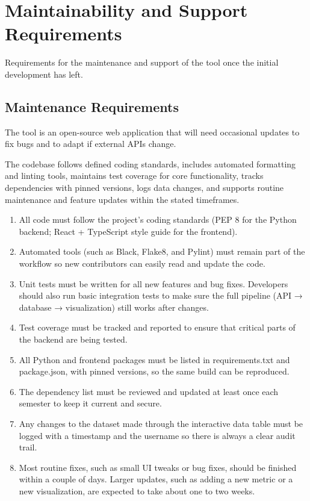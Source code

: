 \documentclass[12pt]{article}
\begin{document}
\section{Maintainability and Support Requirements}
Requirements for the maintenance and support of the tool once the initial development has left.
\subsection{Maintenance Requirements}
The tool is an open-source web application that will need occasional updates to fix bugs and to adapt if external APIs change.

The codebase follows defined coding standards, includes automated formatting and linting tools, maintains test coverage for core functionality, tracks dependencies with pinned versions, logs data changes, and supports routine maintenance and feature updates within the stated timeframes.
\begin{enumerate}[label=MS-MR\arabic*]
\item All code must follow the project’s coding standards (PEP 8 for the Python backend; React + TypeScript style guide for the frontend).
\item Automated tools (such as Black, Flake8, and Pylint) must remain part of the workflow so new contributors can easily read and update the code.
\item Unit tests must be written for all new features and bug fixes. Developers should also run basic integration tests to make sure the full pipeline (API → database → visualization) still works after changes.
\item Test coverage must be tracked and reported to ensure that critical parts of the backend are being tested.
\item All Python and frontend packages must be listed in requirements.txt and package.json, with pinned versions, so the same build can be reproduced.
\item The dependency list must be reviewed and updated at least once each semester to keep it current and secure.
\item Any changes to the dataset made through the interactive data table must be logged with a timestamp and the username so there is always a clear audit trail.
\item Most routine fixes, such as small UI tweaks or bug fixes, should be finished within a couple of days. Larger updates, such as adding a new metric or a new visualization, are expected to take about one to two weeks.
\end{enumerate}
\end{document}
